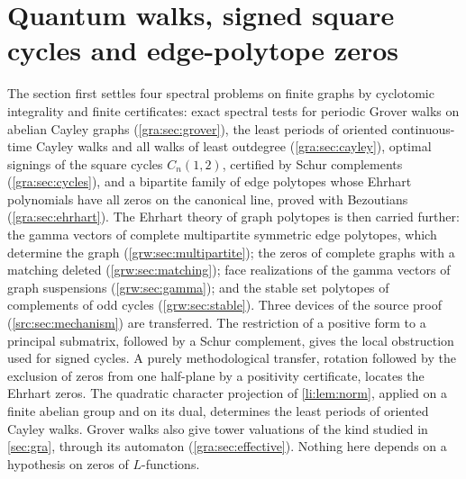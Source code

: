 \providecommand{\grah}{\mathsf{h}}
\providecommand{\graA}{\mathcal{A}}
\providecommand{\graP}{\mathbb{P}}
\providecommand{\gramu}{\boldsymbol{\mu}}
\providecommand{\graPi}{\Pi}
\providecommand{\gracut}{\vartheta}
\providecommand{\graunit}{\operatorname{unit}_p}
\providecommand{\grafiles}[1]{\begin{center}\footnotesize#1\end{center}}
\providecommand{\graJac}{\operatorname{Jac}}
\providecommand{\grahat}[1]{\widehat{#1}}
\providecommand{\grwarcosh}{\operatorname{arcosh}}
\providecommand{\grwconv}{\operatorname{conv}}
\providecommand{\grwCyc}{\mathrm{C}}
\section{Quantum walks, signed square cycles and edge-polytope zeros}\label{sec:grw}

The section first settles four spectral problems on finite graphs by
cyclotomic integrality and finite certificates: exact spectral tests for periodic
Grover walks on abelian Cayley graphs (\cref{gra:sec:grover}), the least
periods of oriented continuous-time Cayley walks and all walks of least
outdegree (\cref{gra:sec:cayley}),
optimal signings of the square cycles $C_n(1,2)$, certified by Schur
complements (\cref{gra:sec:cycles}), and a bipartite family of edge
polytopes whose Ehrhart polynomials have all zeros on the canonical line,
proved with Bezoutians (\cref{gra:sec:ehrhart}). The Ehrhart theory of
graph polytopes is then carried further: the gamma vectors of complete
multipartite symmetric edge polytopes, which determine the graph
(\cref{grw:sec:multipartite}); the zeros of complete graphs with a matching
deleted (\cref{grw:sec:matching}); face realizations of the gamma vectors of
graph suspensions (\cref{grw:sec:gamma}); and the stable set polytopes of
complements of odd cycles (\cref{grw:sec:stable}). Three devices of the source
proof (\cref{src:sec:mechanism}) are transferred. The restriction of a
positive form to a principal submatrix, followed by a Schur complement,
gives the local obstruction used for signed cycles. A purely
methodological transfer, rotation followed by the exclusion of zeros from
one half-plane by a positivity certificate, locates the Ehrhart zeros. The
quadratic character projection of \cref{li:lem:norm}, applied on a finite
abelian group and on its dual, determines the least periods of oriented
Cayley walks. Grover walks also give tower valuations of the kind studied
in \cref{sec:gra}, through its automaton (\cref{gra:sec:effective}).
Nothing here depends on a hypothesis on zeros of $L$-functions.

